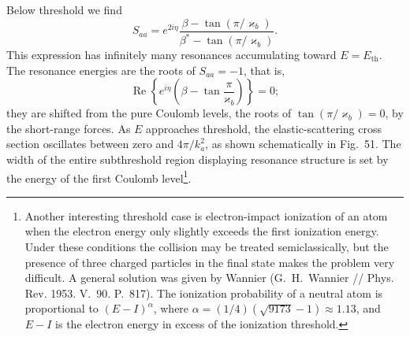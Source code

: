 Below threshold we find
\begin{equation}
 S_{aa}=e^{2i\eta}\frac{\beta-\tan(\pi/\varkappa_b)}
 {\beta^*-\tan(\pi/\varkappa_b)}.
 \tag{147.17}
\end{equation}
This expression has infinitely many resonances accumulating toward $E=E_{\mathrm{th}}$. The resonance energies are the roots of $S_{aa}=-1$, that is,
\[
 \operatorname{Re}\left\{e^{i\eta}\left(\beta-\tan\frac\pi{\varkappa_b}\right)\right\}=0;
\]
they are shifted from the pure Coulomb levels, the roots of $\tan(\pi/\varkappa_b)=0$, by the short-range forces. As $E$ approaches threshold, the elastic-scattering cross section oscillates between zero and $4\pi/k_a^2$, as shown schematically in Fig.~51. The width of the entire subthreshold region displaying resonance structure is set by the energy of the first Coulomb level\footnote{Another interesting threshold case is electron-impact ionization of an atom when the electron energy only slightly exceeds the first ionization energy. Under these conditions the collision may be treated semiclassically, but the presence of three charged particles in the final state makes the problem very difficult. A general solution was given by Wannier (G.~H.~Wannier // Phys. Rev. 1953. V.~90. P.~817). The ionization probability of a neutral atom is proportional to $(E-I)^\alpha$, where $\alpha=(1/4)(\sqrt{9173}-1)\approx1.13$, and $E-I$ is the electron energy in excess of the ionization threshold.}.

\begin{figure}[tbp]
\centering
{}
\caption{}
\end{figure}
